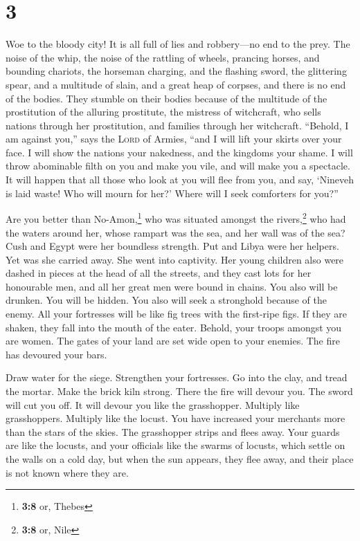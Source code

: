 \hypertarget{section-2}{%
\section{3}\label{section-2}}

 Woe to the bloody city! It is all full of lies and
robbery---no end to the prey.  The noise of the whip, the
noise of the rattling of wheels, prancing horses, and bounding chariots,
 the horseman charging, and the flashing sword, the
glittering spear, and a multitude of slain, and a great heap of corpses,
and there is no end of the bodies. They stumble on their bodies
 because of the multitude of the prostitution of the
alluring prostitute, the mistress of witchcraft, who sells nations
through her prostitution, and families through her witchcraft.
 ``Behold, I am against you,'' says the \textsc{Lord} of
Armies, ``and I will lift your skirts over your face. I will show the
nations your nakedness, and the kingdoms your shame.  I
will throw abominable filth on you and make you vile, and will make you
a spectacle.  It will happen that all those who look at
you will flee from you, and say, `Nineveh is laid waste! Who will mourn
for her?' Where will I seek comforters for you?''

 Are you better than No-Amon,\footnote{\textbf{3:8} or,
  Thebes} who was situated amongst the rivers,\footnote{\textbf{3:8} or,
  Nile} who had the waters around her, whose rampart was the sea, and
her wall was of the sea?  Cush and Egypt were her
boundless strength. Put and Libya were her helpers.  Yet
was she carried away. She went into captivity. Her young children also
were dashed in pieces at the head of all the streets, and they cast lots
for her honourable men, and all her great men were bound in chains.
 You also will be drunken. You will be hidden. You also
will seek a stronghold because of the enemy.  All your
fortresses will be like fig trees with the first-ripe figs. If they are
shaken, they fall into the mouth of the eater.  Behold,
your troops amongst you are women. The gates of your land are set wide
open to your enemies. The fire has devoured your bars.

 Draw water for the siege. Strengthen your fortresses. Go
into the clay, and tread the mortar. Make the brick kiln strong.
 There the fire will devour you. The sword will cut you
off. It will devour you like the grasshopper. Multiply like
grasshoppers. Multiply like the locust.  You have
increased your merchants more than the stars of the skies. The
grasshopper strips and flees away.  Your guards are like
the locusts, and your officials like the swarms of locusts, which settle
on the walls on a cold day, but when the sun appears, they flee away,
and their place is not known where they are.

